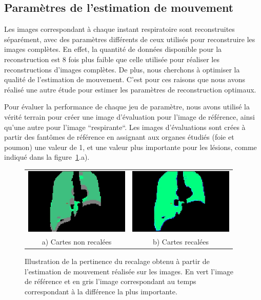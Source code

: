 \subsection{Paramètres de l'estimation de mouvement}

Les images correspondant à chaque instant respiratoire sont reconstruites séparément, avec des paramètres différents de ceux utilisés pour reconstruire les images complètes. En effet, la quantité de données disponible pour la reconstruction est 8 fois plus faible que celle utilisée pour réaliser les reconstructions d'images complètes. De plus, nous cherchons à optimiser la qualité de l'estimation de mouvement. C'est pour ces raisons que nous avons réalisé une autre étude pour estimer les paramètres de reconstruction optimaux. 

Pour évaluer la performance de chaque jeu de paramètre, nous avons utilisé la vérité terrain pour créer une image d'évaluation pour l'image de référence, ainsi qu'une autre pour l'image ``respirante``. Les images d'évaluations sont crées à partir des fantômes de référence en assignant aux organes étudiés (foie et poumon) une valeur de 1, et une valeur plus importante pour les lésions, comme indiqué dans la figure~\ref{lab:illustrationRecalage}.a). 

\begin{figure}
\centering
\begin{tabular}{c c}
	\includegraphics[width=5cm]{images/sansCorrection} & \includegraphics[width=5cm]{images/avecCorrection} \\
	a) Cartes non recalées				& b) Cartes recalées
\end{tabular}
\caption[Illustration du recalage obtenu]{Illustration de la pertinence du recalage obtenu à partir de l'estimation de mouvement réalisée sur les images. En vert l'image de référence et en gris l'image correspondant au temps correspondant à la différence la plus importante. }
\label{lab:illustrationRecalage}
\end{figure}

